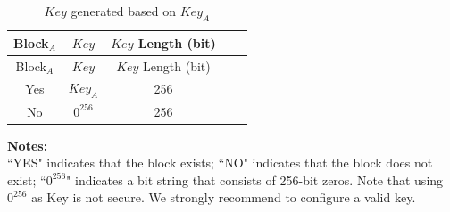 \begin{longtable}[c]{ |c|c|c|c|c| }
\caption{ \begin{math}Key\end{math} generated based on \begin{math}Key_{A}\end{math}}
\label{tab:extmemencr-key-possibility}
\\\hline 
\rowcolor{lightgray}
Block$_A$ & \begin{math}Key\end{math}  & \begin{math}Key\end{math} Length (bit) \\\hline
\endfirsthead
\hline
\rowcolor{lightgray}
Block$_A$ & \begin{math}Key\end{math}  & \begin{math}Key\end{math} Length (bit) \\\hline
\endhead
\endfoot
Yes       &   \begin{math}           Key_{A}\end{math}    &   256   \\\hline
No        &   \begin{math}           0^{256}\end{math}    &   256   \\\hline
\end{longtable}
\vspace{-1.5em}
{\bfseries Notes: }\\
``YES" indicates that the block exists; ``NO" indicates that the block does not exist; ``\begin{math}0^{256}\end{math}" indicates a bit string that consists of 256-bit zeros.
Note that using \begin{math}           0^{256}\end{math} as Key is not secure. We strongly recommend to configure a valid key.
